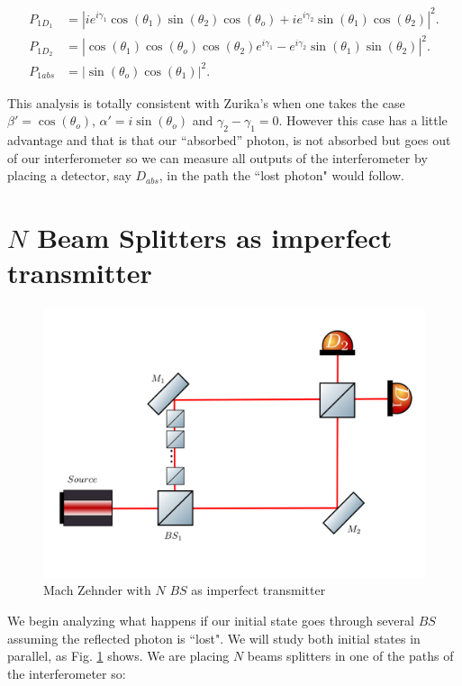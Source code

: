 \documentclass{book}
\begin{document}
\begin{align}
P_{1D_{1}}&=|ie^{i\gamma_{1}}\cos(\theta_{1})\sin(\theta_{2})\cos(\theta_{o})+i e^{i\gamma_{2}}\sin(\theta_{1})\cos(\theta_{2})|^2. \\
P_{1D_{2}}&=|\cos(\theta_{1})\cos(\theta_{o})\cos(\theta_{2})e^{i\gamma_{1}}-e^{i\gamma_{2}} \sin(\theta_{1})\sin(\theta_{2})|^2.\\
P_{1abs}&=|\sin(\theta_{o}) \cos(\theta_{1})|^2.
\end{align}


This analysis is totally consistent with Zurika's \cite{zuri} when one takes the case $\beta'=\cos(\theta_{o})$, $\alpha'=i \sin(\theta_{o})$ and $\gamma_{2}-\gamma_{1}=0$. However this case has a little advantage and that is that our ``absorbed'' photon, is not absorbed but goes out of our interferometer so we can measure all outputs of the interferometer by placing a detector, say $D_{abs}$, in the path the ``lost photon" would follow.

\section{$N$ Beam Splitters as imperfect transmitter }
\vspace{1 cm}


\begin{figure}[hbt!]
\centering
\includegraphics[width=\linewidth,height=8 cm]{images/machzenhderBSS.png}
\caption{Mach Zehnder with $N$ $BS$ as imperfect transmitter}
\label{N_bs}
\end{figure}


We begin analyzing what happens if our initial state goes through several $BS$ assuming the reflected photon is ``lost". We will study both initial states in parallel, as Fig. \ref{N_bs} shows. We are placing $N$ beams splitters in one of the paths of the interferometer so:
\end{document}
